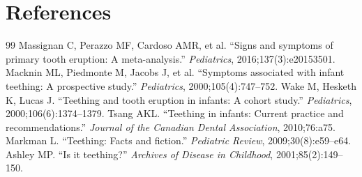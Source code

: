 \section*{References}
\begin{thebibliography}{99}
 Massignan C, Perazzo MF, Cardoso AMR, et al. ``Signs and symptoms of primary tooth eruption: A meta-analysis.'' \textit{Pediatrics}, 2016;137(3):e20153501.
 Macknin ML, Piedmonte M, Jacobs J, et al. ``Symptoms associated with infant teething: A prospective study.'' \textit{Pediatrics}, 2000;105(4):747--752.
 Wake M, Hesketh K, Lucas J. ``Teething and tooth eruption in infants: A cohort study.'' \textit{Pediatrics}, 2000;106(6):1374--1379.
 Tsang AKL. ``Teething in infants: Current practice and recommendations.'' \textit{Journal of the Canadian Dental Association}, 2010;76:a75.
 Markman L. ``Teething: Facts and fiction.'' \textit{Pediatric Review}, 2009;30(8):e59--e64.
 Ashley MP. ``Is it teething?'' \textit{Archives of Disease in Childhood}, 2001;85(2):149--150.
\end{thebibliography}
